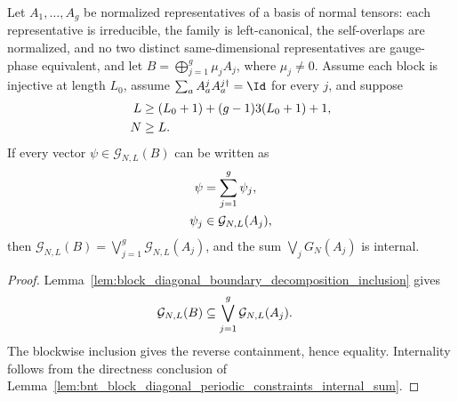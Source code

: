 \begin{lemma}
    \label{lem:bnt_block_diagonal_boundary_decomposition_equality}
    \leanok
    Let $A_1,\ldots,A_g$ be normalized representatives of a basis of normal
    tensors: each representative is irreducible, the family is left-canonical,
    the self-overlaps are normalized, and no two distinct same-dimensional
    representatives are gauge-phase equivalent, and let
    $B=\bigoplus_{j=1}^g\mu_jA_j$, where $\mu_j\ne0$.
    Assume each block is injective at length $L_0$, assume
    $\sum_aA^j_aA^{j\dagger}_a=\Id$ for every $j$, and suppose
    \begin{align}
        L & \ge (L_0+1)+(g-1)3(L_0+1)+1,
        \notag                           \\
        N & \ge L.
        \notag
    \end{align}
    If every vector $\psi\in\mathcal G_{N,L}(B)$ can be written as
    \begin{align}
        \psi   & = \sum_{j=1}^g\psi_j,
        \notag                              \\
        \psi_j & \in \mathcal G_{N,L}(A_j),
        \notag
    \end{align}
    then
    $\mathcal G_{N,L}(B) = \bigvee_{j=1}^g\mathcal G_{N,L}(A_j)$,
    and the sum $\bigvee_jG_N(A_j)$ is internal.
\end{lemma}

\begin{proof}
    \leanok
    Lemma~\ref{lem:block_diagonal_boundary_decomposition_inclusion} gives
    \begin{align}
        \mathcal G_{N,L}(B)
         & \subseteq
        \bigvee_{j=1}^g\mathcal G_{N,L}(A_j).
        \notag
    \end{align}
    The blockwise inclusion gives the reverse containment, hence equality.
    Internality follows from the directness conclusion of
    Lemma~\ref{lem:bnt_block_diagonal_periodic_constraints_internal_sum}.
\end{proof}

